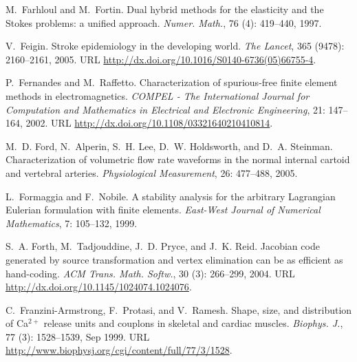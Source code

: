 \begin{thebibliography}{467}
M.~Farhloul and M.~Fortin.
\newblock Dual hybrid methods for the elasticity and the {S}tokes problems: a
  unified approach.
\newblock \emph{Numer. Math.}, 76 (4): 419--440, 1997.

V.~Feigin.
\newblock Stroke epidemiology in the developing world.
\newblock \emph{The Lancet}, 365 (9478): 2160--2161, 2005.
\newblock URL \url{http://dx.doi.org/10.1016/S0140-6736(05)66755-4}.

P.~Fernandes and M.~Raffetto.
\newblock Characterization of spurious-free finite element methods in
  electromagnetics.
\newblock \emph{COMPEL - The International Journal for Computation and
  Mathematics in Electrical and Electronic Engineering}, 21: 147--164,
  2002.
\newblock URL \url{http://dx.doi.org/10.1108/03321640210410814}.

M.~D. Ford, N.~Alperin, S.~H. Lee, D.~W. Holdsworth, and D.~A. Steinman.
\newblock Characterization of volumetric flow rate waveforms in the normal
  internal cartoid and vertebral arteries.
\newblock \emph{Physiological Measurement}, 26: 477--488, 2005.

L.~Formaggia and F.~Nobile.
\newblock A stability analysis for the arbitrary {L}agrangian {E}ulerian
  formulation with finite elements.
\newblock \emph{East-West Journal of Numerical Mathematics}, 7:
  105--132, 1999.

S.~A. Forth, M.~Tadjouddine, J.~D. Pryce, and J.~K. Reid.
\newblock Jacobian code generated by source transformation and vertex
  elimination can be as efficient as hand-coding.
\newblock \emph{ACM Trans. Math. Softw.}, 30 (3): 266--299,
  2004.
\newblock URL \url{http://dx.doi.org/10.1145/1024074.1024076}.

C.~Franzini-Armstrong, F.~Protasi, and V.~Ramesh.
\newblock Shape, size, and distribution of {C}a$^{2+}$ release units and
  couplons in skeletal and cardiac muscles.
\newblock \emph{Biophys. J.}, 77 (3): 1528--1539, Sep 1999.
\newblock URL \url{http://www.biophysj.org/cgi/content/full/77/3/1528}.


\end{thebibliography}
